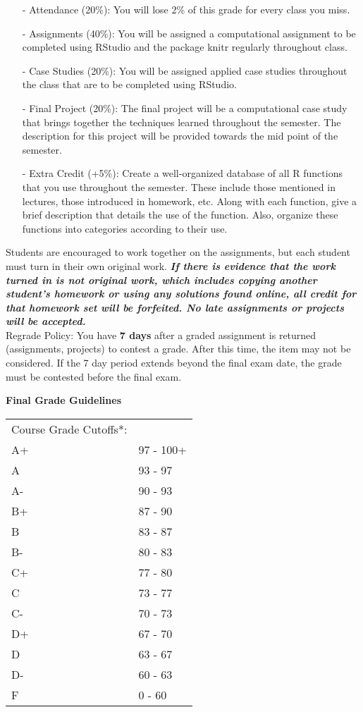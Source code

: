 \documentclass[10pt, oneside]{article}
\begin{document}
\begin{itemize}
	\item[-] Attendance (20\%): You will lose 2\% of this grade for every class you miss.
	\item[-] Assignments (40\%): You will be assigned a computational assignment to be completed using RStudio and the package knitr regularly throughout class.
	\item[-] Case Studies (20\%): You will be assigned applied case studies throughout the class that are to be completed using RStudio.
	\item[-] Final Project (20\%): The final project will be a computational case study that brings together the techniques learned throughout the semester. The description for this project will be provided towards the mid point of the semester.
	\item[-] Extra Credit (+5\%): Create a well-organized database of all R functions that you use throughout the semester. These include those mentioned in lectures, those introduced in homework, etc. Along with each function, give a brief description that details the use of the function. Also, organize these functions into categories according to their use.
\end{itemize}

Students are encouraged to work together on the assignments, but each student must turn in their own original work.\textit{ \textbf{ If there is evidence that the work turned in is not original work, which includes copying another student's homework or using any solutions found online, all credit for that homework set will be forfeited. No late assignments or projects will be accepted.}}\\

Regrade Policy: You have \textbf{7 days} after a graded assignment is returned (assignments, projects) to contest a grade.  After this time, the item may not be considered.  If the 7 day period extends beyond the final exam date, the grade must be contested before the final exam.

\newpage
\thispagestyle{empty}


\noindent \textbf{Final Grade Guidelines}
\begin{table}[ht]
	\small
	\begin{tabular}{ll}
		Course Grade Cutoffs*: & \\
		A+	&97 - 100+ \\
		A	  &93 - 97 \\
		A-	&90 - 93 \\
		B+	&87 - 90 \\
		B	  &83 - 87 \\
		B-	&80 - 83 \\
		C+	&77 - 80 \\
		C	  &73 - 77 \\
		C-	&70 - 73 \\
		D+	&67 - 70 \\
		D	  &63 - 67 \\
		D-	&60 - 63 \\
		F	  &0 - 60 \\ 
	\end{tabular}
\end{table}
\end{document}
